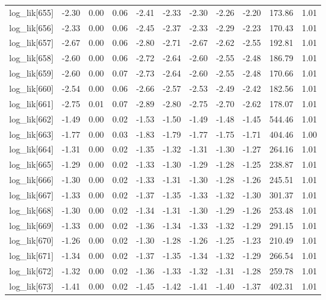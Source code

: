 \begin{table}[ht]
\begin{tabular}{rrrrrrrrrrr}
  log\_lik[655] & -2.30 & 0.00 & 0.06 & -2.41 & -2.33 & -2.30 & -2.26 & -2.20 & 173.86 & 1.01 \\ 
  log\_lik[656] & -2.33 & 0.00 & 0.06 & -2.45 & -2.37 & -2.33 & -2.29 & -2.23 & 170.43 & 1.01 \\ 
  log\_lik[657] & -2.67 & 0.00 & 0.06 & -2.80 & -2.71 & -2.67 & -2.62 & -2.55 & 192.81 & 1.01 \\ 
  log\_lik[658] & -2.60 & 0.00 & 0.06 & -2.72 & -2.64 & -2.60 & -2.55 & -2.48 & 186.79 & 1.01 \\ 
  log\_lik[659] & -2.60 & 0.00 & 0.07 & -2.73 & -2.64 & -2.60 & -2.55 & -2.48 & 170.66 & 1.01 \\ 
  log\_lik[660] & -2.54 & 0.00 & 0.06 & -2.66 & -2.57 & -2.53 & -2.49 & -2.42 & 182.56 & 1.01 \\ 
  log\_lik[661] & -2.75 & 0.01 & 0.07 & -2.89 & -2.80 & -2.75 & -2.70 & -2.62 & 178.07 & 1.01 \\ 
  log\_lik[662] & -1.49 & 0.00 & 0.02 & -1.53 & -1.50 & -1.49 & -1.48 & -1.45 & 544.46 & 1.01 \\ 
  log\_lik[663] & -1.77 & 0.00 & 0.03 & -1.83 & -1.79 & -1.77 & -1.75 & -1.71 & 404.46 & 1.00 \\ 
  log\_lik[664] & -1.31 & 0.00 & 0.02 & -1.35 & -1.32 & -1.31 & -1.30 & -1.27 & 264.16 & 1.01 \\ 
  log\_lik[665] & -1.29 & 0.00 & 0.02 & -1.33 & -1.30 & -1.29 & -1.28 & -1.25 & 238.87 & 1.01 \\ 
  log\_lik[666] & -1.30 & 0.00 & 0.02 & -1.33 & -1.31 & -1.30 & -1.28 & -1.26 & 245.51 & 1.01 \\ 
  log\_lik[667] & -1.33 & 0.00 & 0.02 & -1.37 & -1.35 & -1.33 & -1.32 & -1.30 & 301.37 & 1.01 \\ 
  log\_lik[668] & -1.30 & 0.00 & 0.02 & -1.34 & -1.31 & -1.30 & -1.29 & -1.26 & 253.48 & 1.01 \\ 
  log\_lik[669] & -1.33 & 0.00 & 0.02 & -1.36 & -1.34 & -1.33 & -1.32 & -1.29 & 291.15 & 1.01 \\ 
  log\_lik[670] & -1.26 & 0.00 & 0.02 & -1.30 & -1.28 & -1.26 & -1.25 & -1.23 & 210.49 & 1.01 \\ 
  log\_lik[671] & -1.34 & 0.00 & 0.02 & -1.37 & -1.35 & -1.34 & -1.32 & -1.29 & 266.54 & 1.01 \\ 
  log\_lik[672] & -1.32 & 0.00 & 0.02 & -1.36 & -1.33 & -1.32 & -1.31 & -1.28 & 259.78 & 1.01 \\ 
  log\_lik[673] & -1.41 & 0.00 & 0.02 & -1.45 & -1.42 & -1.41 & -1.40 & -1.37 & 402.31 & 1.01 \\ 

\end{tabular}
\end{table}
